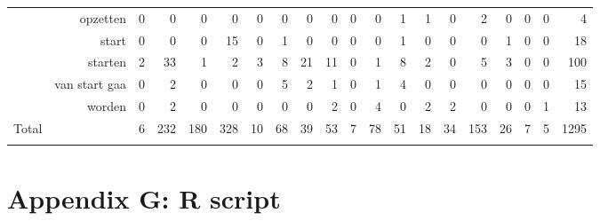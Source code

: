\begin{table}
{\begin{tabularx}{1.5\textwidth}{Xrrrrrrrrrrrrrrrrrrr}
& opzetten &  0 &  0 &  0 &  0 &  0 &  0 &  0 &  0 &  0 &  0 &  1 &  1 &  0 &  2 &  0 &  0 &  0 &  4\\
& start &  0 &  0 &  0 &  15 &  0 &  1 &  0 &  0 &  0 &  0 &  1 &  0 &  0 &  0 &  1 &  0 &  0 &  18\\
& starten &  2 &  33 &  1 &  2 &  3 &  8 &  21 &  11 &  0 &  1 &  8 &  2 &  0 &  5 &  3 &  0 &  0 &  100\\
& van start gaa &  0 &  2 &  0 &  0 &  0 &  5 &  2 &  1 &  0 &  1 &  4 &  0 &  0 &  0 &  0 &  0 &  0 &  15\\
& worden &  0 &  2 &  0 &  0 &  0 &  0 &  0 &  2 &  0 &  4 &  0 &  2 &  2 &  0 &  0 &  0 &  1 &  13\\
Total & &  6 &  232 &  180 &  328 &  10 &  68 &  39 &  53 &  7 &  78 &  51 &  18 &  34 &  153 &  26 &  7 &  5 &  1295\\
\lspbottomrule
\end{tabularx}
}
\end{table}

\newpage
\section{Appendix G: R script}


